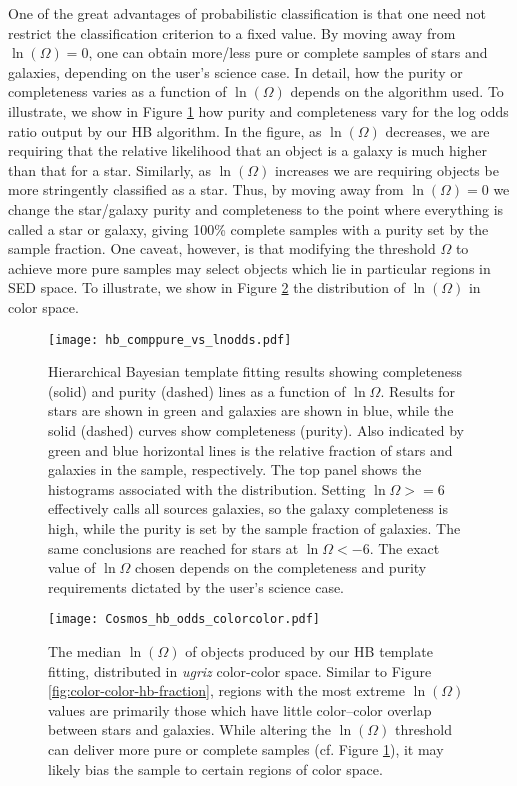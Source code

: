 \documentclass[12pt,preprint]{aastex}
\begin{document}
One of the great advantages of probabilistic classification is that
one need not restrict the classification criterion to a fixed value.
By moving away from $\ln(\Omega)=0$, one can obtain more/less pure or
complete samples of stars and galaxies, depending on the user's
science case.  In detail, how the purity or completeness varies as a
function of $\ln(\Omega)$ depends on the algorithm used.  To
illustrate, we show in Figure \ref{fig:hb-logodds} how purity and
completeness vary for the log odds ratio output by our HB algorithm.
In the figure, as $\ln(\Omega)$ decreases, we are requiring that the
relative likelihood that an object is a galaxy is much higher than
that for a star.  Similarly, as $\ln(\Omega)$ increases we are
requiring objects be more stringently classified as a star.  Thus, by
moving away from $\ln(\Omega)=0$ we change the star/galaxy purity and
completeness to the point where everything is called a star or galaxy,
giving 100\% complete samples with a purity set by the sample
fraction.  One caveat, however, is that modifying the threshold
$\Omega$ to achieve more pure samples may select objects which lie in
particular regions in SED space.  To illustrate, we show in Figure
\ref{fig:color-color-hb-odds} the distribution of $\ln(\Omega)$ in
color space.

\begin{figure}
\centering
\texttt{[image: hb\_comppure\_vs\_lnodds.pdf]}
\caption{Hierarchical Bayesian template fitting results showing
  completeness (solid) and purity (dashed) lines as a function of
  $\ln\Omega$.  Results for stars are shown in green and galaxies are
  shown in blue, while the solid (dashed) curves show completeness
  (purity).  Also indicated by green and blue horizontal lines is the
  relative fraction of stars and galaxies in the sample, respectively.
  The top panel shows the histograms associated with the
  distribution. Setting $\ln\Omega>=6$ effectively calls all sources
  galaxies, so the galaxy completeness is high, while the purity is
  set by the sample fraction of galaxies.  The same conclusions are
  reached for stars at $\ln\Omega<-6$.  The exact value of $\ln\Omega$
  chosen depends on the completeness and purity requirements dictated
  by the user's science case.}
\label{fig:hb-logodds}
\end{figure}



\begin{figure}
\centering
\texttt{[image: Cosmos\_hb\_odds\_colorcolor.pdf]}
\caption{The median $\ln(\Omega)$ of objects produced by our HB
  template fitting, distributed in {\it ugriz} color-color space.
  Similar to Figure \ref{fig:color-color-hb-fraction}, regions with
  the most extreme $\ln(\Omega)$ values are primarily those which have
  little color--color overlap between stars and galaxies.  While
  altering the $\ln(\Omega)$ threshold can deliver more pure or
  complete samples (cf. Figure \ref{fig:hb-logodds}), it may likely
  bias the sample to certain regions of color space.}
\label{fig:color-color-hb-odds}
\end{figure}
\end{document}
